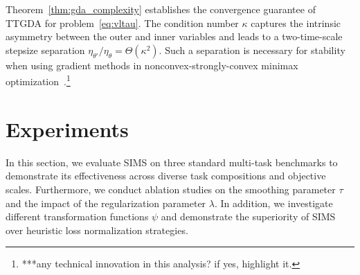 \documentclass[sigconf]{acmart}
\begin{document}
Theorem~\ref{thm:gda_complexity} establishes the convergence guarantee of TTGDA for problem~\eqref{eq:vltau}. The condition number $\kappa$ captures the intrinsic asymmetry between the outer and inner variables and leads to a two-time-scale stepsize separation $\eta_{\theta'}/\eta_{\theta}=\Theta(\kappa^2)$. Such a separation is necessary for stability when using gradient methods in nonconvex-strongly-convex minimax optimization~\cite{lin2020gradient,xu2023unified,zhang2024generalization}.\footnote{***any technical innovation in this analysis? if yes, highlight it.}






\section{Experiments}
In this section, we evaluate SIMS on three standard multi-task benchmarks
to demonstrate its effectiveness across diverse task compositions and objective scales. Furthermore, we conduct ablation studies on the smoothing parameter $\tau$ and the impact of the regularization parameter $\lambda$. In addition, we investigate different transformation functions $\psi$ and demonstrate the superiority of SIMS over heuristic loss normalization strategies.
\end{document}
